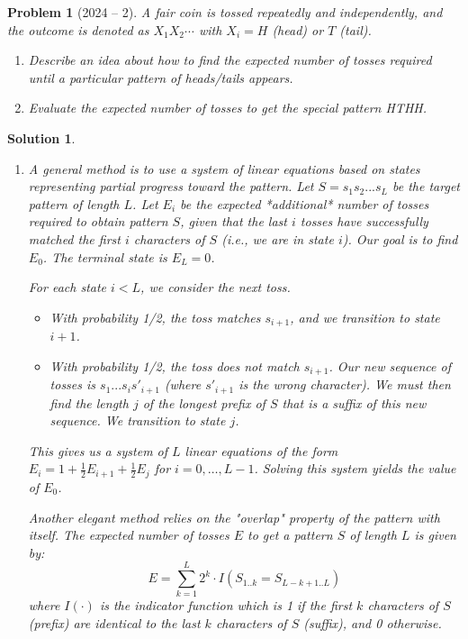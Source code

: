 \documentclass[12pt]{amsart}
\newtheorem{problem}{Problem}
\newtheorem*{solution}{Solution}
\begin{document}
\begin{problem}[2024 -- 2]
A fair coin is tossed repeatedly and independently, and the outcome is denoted as $X_1 X_2 \cdots$ with $X_i=H$ (head) or $T$ (tail).
\begin{enumerate}[label=(\alph*)]
\item Describe an idea about how to find the expected number of tosses required until a particular pattern of heads/tails appears.
\item Evaluate the expected number of tosses to get the special pattern HTHH.
\end{enumerate}
\end{problem}
\begin{solution}
\begin{enumerate}[label=(\alph*)]
\item A general method is to use a system of linear equations based on states representing partial progress toward the pattern. Let $S=s_1s_2...s_L$ be the target pattern of length $L$.
Let $E_i$ be the expected *additional* number of tosses required to obtain pattern $S$, given that the last $i$ tosses have successfully matched the first $i$ characters of $S$ (i.e., we are in state $i$). Our goal is to find $E_0$. The terminal state is $E_L=0$.

For each state $i < L$, we consider the next toss.
\begin{itemize}
    \item With probability 1/2, the toss matches $s_{i+1}$, and we transition to state $i+1$.
    \item With probability 1/2, the toss does not match $s_{i+1}$. Our new sequence of tosses is $s_1...s_i s'_{i+1}$ (where $s'_{i+1}$ is the wrong character). We must then find the length $j$ of the longest prefix of $S$ that is a suffix of this new sequence. We transition to state $j$.
\end{itemize}
This gives us a system of $L$ linear equations of the form $E_i = 1 + \frac{1}{2}E_{i+1} + \frac{1}{2}E_j$ for $i=0, \dots, L-1$. Solving this system yields the value of $E_0$.

Another elegant method relies on the "overlap" property of the pattern with itself. The expected number of tosses $E$ to get a pattern $S$ of length $L$ is given by:
$$ E = \sum_{k=1}^{L} 2^k \cdot I(S_{1..k} = S_{L-k+1..L}) $$
where $I(\cdot)$ is the indicator function which is 1 if the first $k$ characters of $S$ (prefix) are identical to the last $k$ characters of $S$ (suffix), and 0 otherwise.


\end{enumerate}
\end{solution}
\end{document}
